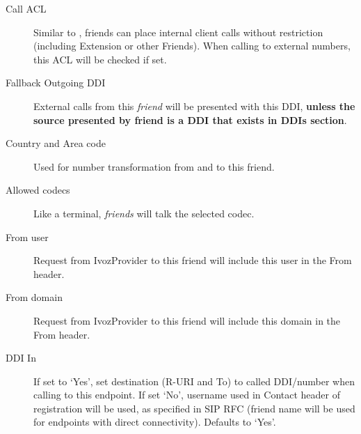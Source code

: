\documentclass[letterpaper,10pt,english]{sphinxmanual}
\begin{document}
\begin{description}
\item[{Call ACL}] \leavevmode{}\label{administration_portal/client/vpbx/routing_endpoints/friends/remote_friends:term-call-acl}
Similar to {\hyperref[administration_portal/client/vpbx/users:users]{}}, friends can place internal
client calls without restriction (including Extension or other Friends).
When calling to external numbers, this ACL will be checked if set.

\item[{Fallback Outgoing DDI}] \leavevmode{}\label{administration_portal/client/vpbx/routing_endpoints/friends/remote_friends:term-fallback-outgoing-ddi}
External calls from this \emph{friend} will be presented with this DDI, \textbf{unless
the source presented by friend is a DDI that exists in DDIs section}.

\item[{Country and Area code}] \leavevmode{}\label{administration_portal/client/vpbx/routing_endpoints/friends/remote_friends:term-country-and-area-code}
Used for number transformation from and to this friend.

\item[{Allowed codecs}] \leavevmode{}\label{administration_portal/client/vpbx/routing_endpoints/friends/remote_friends:term-allowed-codecs}
Like a terminal, \emph{friends} will talk the selected codec.

\item[{From user}] \leavevmode{}\label{administration_portal/client/vpbx/routing_endpoints/friends/remote_friends:term-from-user}
Request from IvozProvider to this friend will include this user in
the From header.

\item[{From domain}] \leavevmode{}\label{administration_portal/client/vpbx/routing_endpoints/friends/remote_friends:term-from-domain}
Request from IvozProvider to this friend will include this domain in
the From header.

\item[{DDI In}] \leavevmode{}\label{administration_portal/client/vpbx/routing_endpoints/friends/remote_friends:term-ddi-in}
If set to `Yes', set destination (R-URI and To) to called DDI/number when calling to this endpoint. If set `No', username
used in Contact header of registration will be used, as specified in SIP RFC (friend name will be used for
endpoints with direct connectivity). Defaults to `Yes'.


\end{description}
\end{document}
